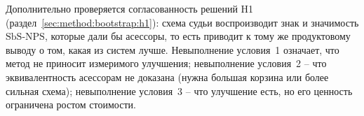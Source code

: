 Дополнительно проверяется согласованность решений H1
(раздел~\ref{sec:method:bootstrap:h1}): схема судьи воспроизводит знак и
значимость $\mathrm{SbS\text{-}NPS}$, которые дали бы асессоры, то есть
приводит к тому же продуктовому выводу о том, какая из систем лучше.
Невыполнение условия~1 означает, что метод не приносит измеримого
улучшения; невыполнение условия~2 -- что эквивалентность асессорам не
доказана (нужна большая корзина или более сильная схема); невыполнение
условия~3 -- что улучшение есть, но его ценность ограничена ростом
стоимости.
